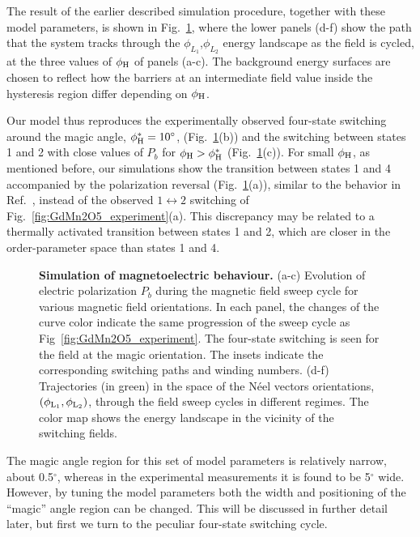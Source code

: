 The result of the earlier described simulation procedure, together with these model parameters, is shown in Fig.~\ref{fig:GdMn2O5_theory}, where the lower panels (d-f) show the path that the system tracks through the $\phi_{L_1}$,$\phi_{L_2}$ energy landscape as the field is cycled, at the three values of $\phi_{\rm H}$ of panels (a-c).
The background energy surfaces are chosen to reflect how the barriers at an intermediate field value inside the hysteresis region differ depending on $\phi_{\rm H}$.

Our model thus reproduces the experimentally observed four-state switching around the magic angle, $\phi_{\rm H}^\ast  = 10^\circ$, (Fig.~\ref{fig:GdMn2O5_theory}(b)) and the switching between states 1 and 2 with close values of $P_b$ for $\phi_{\rm H} > \phi_{\rm H}^\ast$  (Fig.~\ref{fig:GdMn2O5_theory}(c)).
For small $\phi_{\rm H}$, as mentioned before, our simulations show the transition between states 1 and 4 accompanied by the polarization reversal (Fig.~\ref{fig:GdMn2O5_theory}(a)), similar to the behavior in Ref.~\cite{Lee13}, instead of the observed $1\leftrightarrow2$ switching of Fig.~\ref{fig:GdMn2O5_experiment}(a). 
This discrepancy may be related to a thermally activated transition between states 1 and 2, which are closer in the order-parameter space than states 1 and 4.
\begin{figure}[b!]
    \caption{\label{fig:GdMn2O5_theory}{\bf Simulation of magnetoelectric behaviour.}
    (a-c) Evolution of electric polarization $P_b$ during the magnetic field sweep cycle for various magnetic field orientations. 
   In each panel, the changes of the curve color indicate the same progression of the sweep cycle as Fig~\ref{fig:GdMn2O5_experiment}. The four-state switching is seen for the field at the magic orientation. 
    The insets indicate the corresponding switching paths and winding numbers.
    (d-f) Trajectories (in green) in the space of the N\'eel vectors orientations, $(\phi_{\rm L_1},\phi_{\rm L_2})$, through the field sweep cycles in different regimes. The color map shows the energy landscape in the vicinity of the switching fields. 
}
\end{figure}

The magic angle region for this set of model parameters is relatively narrow, about 0.5$^\circ$, whereas in the experimental measurements it is found to be 5$^\circ$ wide.
However, by tuning the model parameters both the width and positioning of the ``magic'' angle region can be changed.
This will be discussed in further detail later, but first we turn to the peculiar four-state switching cycle.

